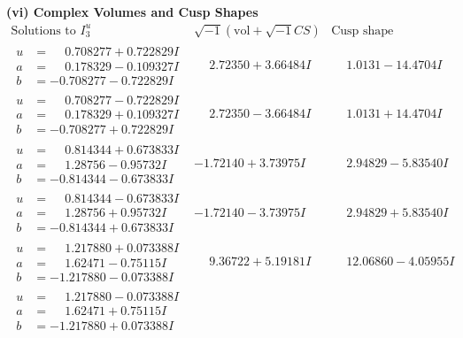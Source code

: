 \documentclass[1p]{elsarticle_modified}
\theoremstyle{definition}
\newcommand{\I}{\sqrt{-1}}
\begin{document}
\newpage\flushleft \textbf{(vi) Complex Volumes and Cusp Shapes}
$$\begin{array}{c|c|c}  
\text{Solutions to }I^u_{3}& \I (\text{vol} + \sqrt{-1}CS) & \text{Cusp shape}\\
 \hline 
\begin{aligned}
u &= \phantom{-}0.708277 + 0.722829 I \\
a &= \phantom{-}0.178329 - 0.109327 I \\
b &= -0.708277 - 0.722829 I\end{aligned}
 & \phantom{-}2.72350 + 3.66484 I & \phantom{-}1.0131 - 14.4704 I \\ \hline\begin{aligned}
u &= \phantom{-}0.708277 - 0.722829 I \\
a &= \phantom{-}0.178329 + 0.109327 I \\
b &= -0.708277 + 0.722829 I\end{aligned}
 & \phantom{-}2.72350 - 3.66484 I & \phantom{-}1.0131 + 14.4704 I \\ \hline\begin{aligned}
u &= \phantom{-}0.814344 + 0.673833 I \\
a &= \phantom{-}1.28756 - 0.95732 I \\
b &= -0.814344 - 0.673833 I\end{aligned}
 & -1.72140 + 3.73975 I & \phantom{-}2.94829 - 5.83540 I \\ \hline\begin{aligned}
u &= \phantom{-}0.814344 - 0.673833 I \\
a &= \phantom{-}1.28756 + 0.95732 I \\
b &= -0.814344 + 0.673833 I\end{aligned}
 & -1.72140 - 3.73975 I & \phantom{-}2.94829 + 5.83540 I \\ \hline\begin{aligned}
u &= \phantom{-}1.217880 + 0.073388 I \\
a &= \phantom{-}1.62471 - 0.75115 I \\
b &= -1.217880 - 0.073388 I\end{aligned}
 & \phantom{-}9.36722 + 5.19181 I & \phantom{-}12.06860 - 4.05955 I \\ \hline\begin{aligned}
u &= \phantom{-}1.217880 - 0.073388 I \\
a &= \phantom{-}1.62471 + 0.75115 I \\
b &= -1.217880 + 0.073388 I\end{aligned}

\end{array}$$
\end{document}
